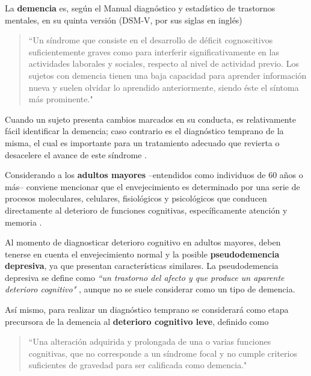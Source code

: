 La \textbf{demencia} es, según el Manual diagnóstico y estadístico de trastornos mentales, en su 
quinta versión (DSM-V, por sus siglas en inglés)
\begin{quote}
``Un síndrome que consiste en el desarrollo de déficit cognoscitivos suficientemente graves como para 
interferir significativamente en las actividades laborales y sociales, respecto al nivel de 
actividad previo.
%
Los sujetos con demencia tienen una baja capacidad para aprender información nueva y suelen olvidar 
lo aprendido anteriormente, siendo éste el síntoma más prominente."  \cite{DCM5}
\end{quote}

Cuando un sujeto presenta cambios marcados en su conducta, es relativamente fácil identificar la 
demencia; caso contrario es el diagnóstico temprano de la misma, el cual es importante para un 
tratamiento adecuado que revierta o desacelere el avance de este síndrome \cite{Knopman01}.

Considerando a los \textbf{adultos mayores} --entendidos como individuos de 60 años o más--
conviene mencionar que el envejecimiento es determinado por una serie de procesos moleculares, 
celulares, fisiológicos y psicológicos que conducen directamente al deterioro de funciones 
cognitivas, específicamente atención y memoria \cite{Park09}.
%

Al momento de diagnosticar deterioro cognitivo en adultos mayores, deben tenerse en cuenta el 
envejecimiento normal y la posible \textbf{pseudodemencia depresiva}, ya que presentan 
características similares. 
%
La pseudodemencia depresiva se define como \textit{``un trastorno del afecto y que produce un aparente deterioro cognitivo"} \cite{DCM5}, aunque no se suele considerar como un tipo de demencia.

Así mismo, para realizar un diagnóstico temprano se considerará como etapa precursora de la 
demencia al \textbf{deterioro cognitivo leve}, definido como 
\begin{quote}
``Una alteración adquirida y prolongada de una o varias funciones cognitivas, que no corresponde a un 
síndrome focal y no cumple criterios suficientes de gravedad para ser calificada como demencia."
\cite{Robles02}
\end{quote}

